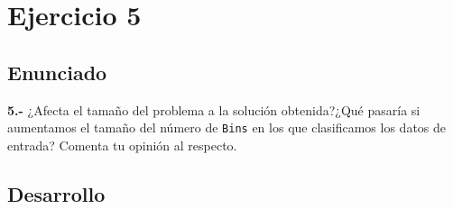\section{Ejercicio 5}
\subsection{Enunciado}
\begin{ejer}
    \textbf{5.-} ¿Afecta el tamaño del problema a la solución obtenida?¿Qué pasaría si aumentamos el tamaño
    del número de \texttt{Bins} en los que clasificamos los datos de entrada? Comenta tu opinión al respecto.
\end{ejer}
\subsection{Desarrollo}
